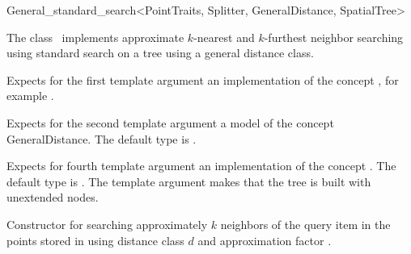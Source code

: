 

\begin{ccRefClass}{General_standard_search<PointTraits, Splitter, GeneralDistance, SpatialTree>} 


\ccDefinition
  
The class \ccRefName\ implements approximate $k$-nearest and $k$-furthest neighbor searching
using standard search on a tree using a general distance 
class. 


\ccParameters

Expects for the first template argument an implementation of the concept ,
for example .

Expects for the second template argument a model of the
concept GeneralDistance. The default type is 
.


Expects for fourth template argument an implementation of the concept .
The default type is . The 
template argument  makes that the tree is built with unextended nodes.

\ccTypes





\ccCreation
{}  %


\def\ccLongParamLayout{\ccTrue}
{Constructor for searching approximately $k$ neighbors of the query item  
in the points stored in  using 
distance class $d$ and approximation factor .}


\end{ccRefClass}
